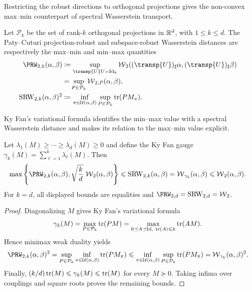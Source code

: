 Restricting the robust directions to orthogonal projections gives the non-convex max--min counterpart of spectral Wasserstein transport.

\begin{defn}\label{def-projection-subspace-robust-wasserstein}
	Let $\mathcal P_k$ be the set of rank-$k$ orthogonal projections in $\mathbb{R}^d$, with $1\leq k\leq d$.
	The Paty--Cuturi projection-robust and subspace-robust Wasserstein distances are respectively the max--min and min--max quantities
	\[
	\begin{aligned}
		\PRW_{2,k}(\alpha,\beta)
		&\eqdef
		\sup_{\transp{U}U=\Id_k}
		\Wass_2((\transp{U})_\sharp\alpha,(\transp{U})_\sharp\beta)\\
		&=
		\sup_{P\in\mathcal P_k}\Wass_{2,P}(\alpha,\beta),\\
		\SRW_{2,k}(\alpha,\beta)^2
		&\eqdef
		\inf_{\pi\in\Couplings(\alpha,\beta)}
		\sup_{P\in\mathcal P_k}\tr(PM_\pi).
	\end{aligned}
	\]
\end{defn}

Ky Fan's variational formula identifies the min--max value with a spectral Wasserstein distance and makes its relation to the max--min value explicit.

\begin{prop}\label{prop-ky-fan-srw-comparison}
	Let $\lambda_1(M)\geq\cdots\geq\lambda_d(M)\geq0$ and define the Ky Fan gauge $\gamma_k(M)=\sum_{\ell=1}^k\lambda_\ell(M)$. Then
	\[
		\max\left\{\PRW_{2,k}(\alpha,\beta),\sqrt{\frac{k}{d}}\,\Wass_2(\alpha,\beta)\right\}
		\leq
		\SRW_{2,k}(\alpha,\beta)
		=\Wass_{\gamma_k}(\alpha,\beta)
		\leq
		\Wass_2(\alpha,\beta).
	\]
	For $k=d$, all displayed bounds are equalities and $\PRW_{2,d}=\SRW_{2,d}=\Wass_2$.
\end{prop}
\begin{proof}
	Diagonalizing $M$ gives Ky Fan's variational formula
	\[
		\gamma_k(M)
		=
		\max_{P\in\mathcal P_k}\operatorname{tr}(PM)
		=
		\max_{0\preceq A\preceq\mathrm{Id},\ \operatorname{tr}(A)\leqslant k}\operatorname{tr}(AM).
	\]
	Hence minimax weak duality yields
	\[
		\PRW_{2,k}(\alpha,\beta)^2
		=
		\sup_{P\in\mathcal P_k}\inf_{\pi\in\Couplings(\alpha,\beta)}\tr(PM_\pi)
		\leq
		\inf_{\pi\in\Couplings(\alpha,\beta)}\sup_{P\in\mathcal P_k}\tr(PM_\pi)
		=
		\Wass_{\gamma_k}(\alpha,\beta)^2.
	\]
	Finally, $(k/d)\operatorname{tr}(M)\leqslant\gamma_k(M)\leqslant\operatorname{tr}(M)$ for every $M\succeq0$. Taking infima over couplings and square roots proves the remaining bounds.
\end{proof}

